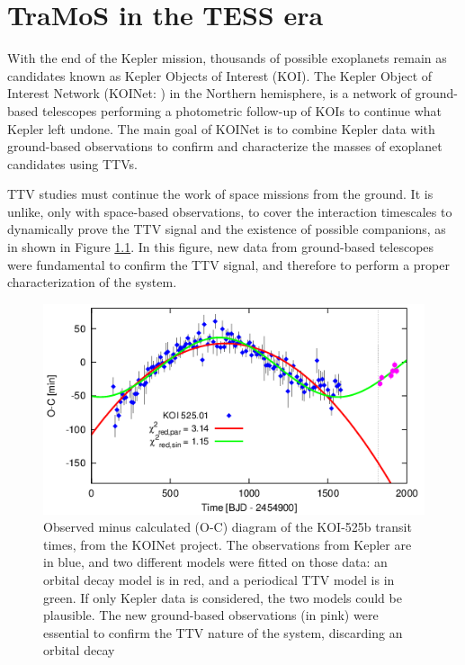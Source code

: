 \chapter{TraMoS in the TESS era}\label{chap:tess}

With the end of the Kepler mission, thousands of possible exoplanets remain as candidates known as Kepler Objects of Interest (KOI). The Kepler Object of Interest Network (KOINet: \citep{vonEssen2018,Freuddenthal2018}) in the Northern hemisphere, is a network of ground-based telescopes performing a photometric follow-up of KOIs to continue what Kepler left undone. The main goal of KOINet is to combine Kepler data with ground-based observations to confirm and characterize the masses of exoplanet candidates using TTVs.

TTV studies must continue the work of space missions from the ground. It is unlike, only with space-based observations, to cover the interaction timescales to dynamically prove the TTV signal and the existence of possible companions, as in shown in Figure \ref{koinet}. In this figure, new data from ground-based telescopes were fundamental to confirm the TTV signal, and therefore to perform a proper characterization of the system.

\begin{figure}
\centering
\includegraphics[width=0.8\columnwidth]{imagenes/koinet.png}
\caption{Observed minus calculated (O-C) diagram of the KOI-525b transit times, from the KOINet project. The observations from Kepler are in blue, and two different models were fitted on those data: an orbital decay model is in red, and a periodical TTV model is in green. If only Kepler data is considered, the two models could be plausible. The new ground-based observations (in pink) were essential to confirm the TTV nature of the system, discarding an orbital decay}
\label{koinet}
\end{figure}

